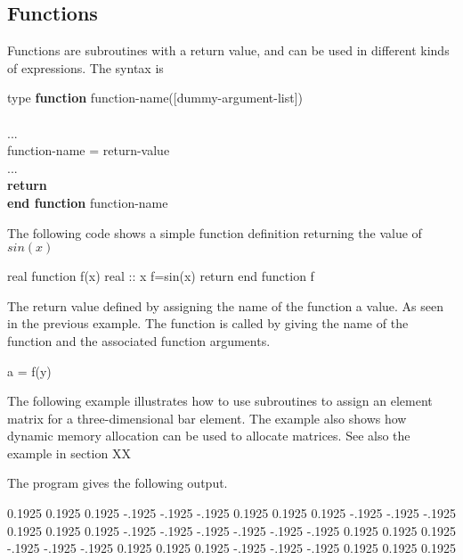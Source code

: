 \subsection{Functions}

Functions are subroutines with a return value, and can be used in different kinds of expressions. The syntax is

\begin{fsyntax}
type \textbf{function} function-name([dummy-argument-list])\\
\\
\ftab ...\\
\ftab function-name = return-value\\
\ftab ...\\
\ftab \textbf{return}\\
\textbf{end function} function-name
\end{fsyntax}

The following code shows a simple function definition returning the value of $sin(x)$

\begin{fortrancodeenv}
real function f(x)
    real :: x
    f=sin(x)
    return
end function f
\end{fortrancodeenv}

The return value defined by assigning the name of the function a value. As seen in the previous example. The function is called by giving the name of the function and the associated function arguments.

\begin{fortrancodeenv}
a = f(y)
\end{fortrancodeenv}

The following example illustrates how to use subroutines to assign an element matrix for a three-dimensional bar element. The example also shows how dynamic memory allocation can be used to allocate matrices. See also the example in section XX


The program gives the following output.

\begin{fortrancodeenv}
0.1925    0.1925    0.1925    -.1925    -.1925    -.1925
0.1925    0.1925    0.1925    -.1925    -.1925    -.1925
0.1925    0.1925    0.1925    -.1925    -.1925    -.1925
-.1925    -.1925    -.1925    0.1925    0.1925    0.1925
-.1925    -.1925    -.1925    0.1925    0.1925    0.1925
-.1925    -.1925    -.1925    0.1925    0.1925    0.1925
\end{fortrancodeenv}

